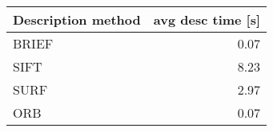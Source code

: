 \begin{tabular}{ l| r }
\label{tab_desctimes}
	Description method & avg desc time [s] \\
	\hline
	 BRIEF & 0.07 \\
	 SIFT & 8.23 \\
	 SURF & 2.97 \\
	 ORB & 0.07
\end{tabular}
